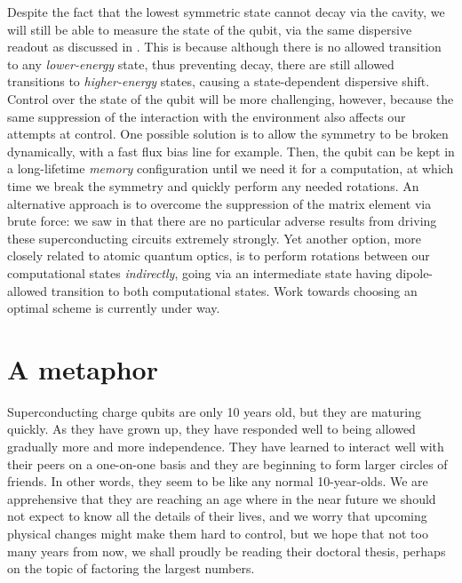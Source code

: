 Despite the fact that the lowest symmetric state cannot decay via the cavity, we will still be able to measure the state of the qubit, via the same dispersive readout as discussed in . This is because although there is no allowed transition to any \emph{lower-energy} state, thus preventing decay, there are still allowed transitions to \emph{higher-energy} states, causing a state-dependent dispersive shift. Control over the state of the qubit will be more challenging, however, because the same suppression of the interaction with the environment also affects our attempts at control. One possible solution is to allow the symmetry to be broken dynamically, with a fast flux bias line for example. Then, the qubit can be kept in a long-lifetime \emph{memory} configuration until we need it for a computation, at which time we break the symmetry and quickly perform any needed rotations. An alternative approach is to overcome the suppression of the matrix element via brute force: we saw in  that there are no particular adverse results from driving these superconducting circuits extremely strongly. Yet another option, more closely related to atomic quantum optics, is to perform rotations between our computational states \emph{indirectly}, going via an intermediate state having dipole-allowed transition to both computational states. Work towards choosing an optimal scheme is currently under way.

\section{A metaphor}
Superconducting charge qubits are only 10 years old, but they are maturing quickly. As they have grown up, they have responded well to being allowed gradually more and more independence. They have learned to interact well with their peers on a one-on-one basis and they are beginning to form larger circles of friends. In other words, they seem to be like any normal 10-year-olds.  We are apprehensive that they are reaching an age where in the near future we should not expect to know all the details of their lives, and we worry that upcoming physical changes might make them hard to control, but we hope that not too many years from now, we shall proudly be reading their doctoral thesis, perhaps on the topic of factoring the largest numbers.
\begin{center}\end{center}
